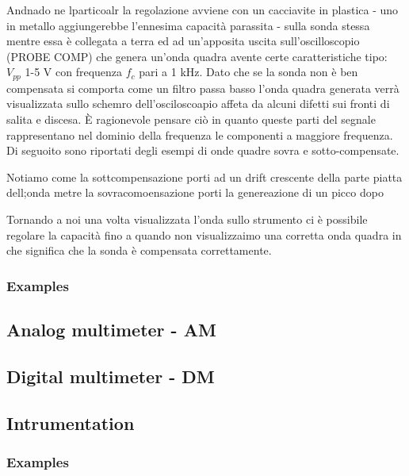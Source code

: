 \documentclass[../main.tex]{subfiles}
\begin{document}
Andnado ne lparticoalr la regolazione avviene con un cacciavite in plastica - uno in metallo aggiungerebbe l'ennesima capacità parassita - sulla sonda stessa mentre essa è collegata a terra ed ad un'apposita uscita sull'oscilloscopio (PROBE COMP) che genera un'onda quadra avente certe caratteristiche tipo: $V_{pp}$ 1-5 V con frequenza $f_c$ pari a 1 kHz.
Dato che se la sonda non è ben compensata si comporta come un filtro passa basso l'onda quadra generata verrà visualizzata sullo schemro dell'osciloscoapio affeta da alcuni difetti sui fronti di salita e discesa. È ragionevole pensare ciò in quanto queste parti del segnale rappresentano nel dominio della frequenza le componenti a maggiore frequenza. Di seguoito sono riportati degli esempi di onde quadre sovra e sotto-compensate. 


Notiamo come la sottcompensazione porti ad un drift crescente della parte piatta dell;onda  metre la sovracomoensazione porti la genereazione di un picco dopo  

Tornando a noi una volta visualizzata l'onda sullo strumento ci è possibile regolare la capacità fino a quando non visualizzaimo una corretta onda quadra in che significa che la sonda è compensata correttamente.


\subsubsection{Examples}

\subsection{Analog multimeter - AM}


\subsection{Digital multimeter - DM}

\subsection{Intrumentation}


\subsubsection{Examples}
\end{document}
